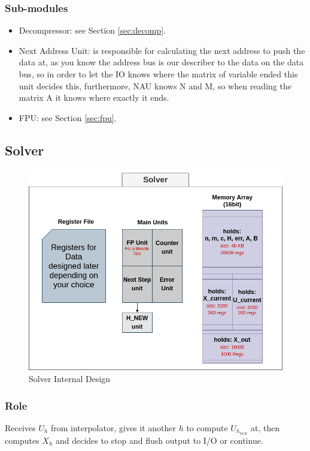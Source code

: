 \documentclass[12pt]{report}
\begin{document}
\subsubsection{Sub-modules}

\begin{itemize}
    \item {Decompressor}: see Section \ref{sec:decomp}.
    \item {Next Address Unit}: is responsible for calculating the next address to push the data at, as you know the address bus is our describer to the data on the data bus, so in order to let the IO knows where the matrix of variable ended this unit decides this, furthermore, {NAU} knows {N} and {M}, so when reading the matrix {A} it knows where exactly it ends.
    \item {FPU}: see Section \ref{sec:fpu}.
\end{itemize}

\subsection{Solver}

\begin{figure}[hp]
    \centering
    \includegraphics[width=\textwidth]{solver}
    \caption{Solver Internal Design}
    \label{fig:solver}
\end{figure}


\subsubsection{Role}
Receives $U_h$ from interpolator, gives it another $h$ to compute $U_{h_{new}}$ at, then computes $X_h$ and decides to stop and flush output to I/O or continue.
\end{document}
